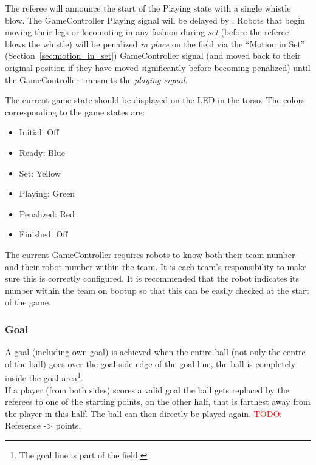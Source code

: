 The referee will announce the start of the Playing state with a single whistle blow.
The GameController Playing signal will be delayed by \PlayingDelayTime.
Robots that begin moving their legs or locomoting in any fashion during \emph{set} (\ie before the referee blows the whistle) will be penalized \textit{in place} on the field via the ``Motion in Set'' (\cf Section~\ref{sec:motion_in_set}) GameController signal (and moved back to their original position if they have moved significantly before becoming penalized) until the GameController transmits the \emph{playing signal}.

The current game state should be displayed on the LED in the torso. The colors corresponding to the game states are:

\begin{itemize}
	
	\item Initial: Off
	
	\item Ready: Blue
	
	\item Set: Yellow
	
	\item Playing: Green
	
	\item Penalized: Red
	
	\item Finished: Off
	
\end{itemize}

The current GameController requires robots to know both their team number and their robot number within the team. It is each team's responsibility to make sure this is correctly configured. It is recommended that the robot indicates its number within the team on bootup so that this can be easily checked at the start of the game.

\subsubsection{Goal}
\label{sec:goal}
A goal (including own goal) is achieved when the entire ball (not only the centre of the ball) goes over the goal-side edge of the goal line, \ie the ball is completely inside the goal area\footnote{The goal line is part of the field.}. \\
If a player (from both sides) scores a valid goal the ball gets replaced by the referees to one of the starting points, on the other half, that is farthest away from the player in this half. The ball can then directly be played again. 
\textcolor{red}{TODO}: Reference -> points.

